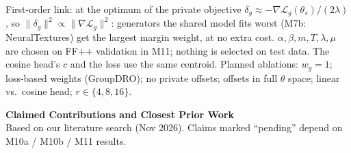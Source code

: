 \documentclass[11pt]{article}
\begin{document}
\vfill
{\small First-order link: at the optimum of the private objective \(\delta_g\approx-\nabla\mathcal{L}_g(\theta_s)/(2\lambda)\), so \(\|\delta_g\|^2\propto\|\nabla\mathcal{L}_g\|^2\): generators the shared model fits worst (M7b: NeuralTextures) get the largest margin weight, at no extra cost. \(\alpha,\beta,m,T,\lambda,\mu\) are chosen on FF++ validation in M11; nothing is selected on test data. The cosine head's \(c\) and the loss use the same centroid. Planned ablations: \(w_g=1\); loss-based weights (GroupDRO); no private offsets; offsets in full \(\theta\) space; linear vs.\ cosine head; \(r\in\{4,8,16\}\).}

\newpage
\begin{center}
{\Large\bfseries Claimed Contributions and Closest Prior Work}\\[2pt]
{\small Based on our literature search (Nov 2026). Claims marked ``pending'' depend on M10a / M10b / M11 results.}
\end{center}
\vspace{3mm}
\end{document}
